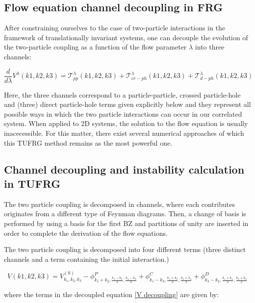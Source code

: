 \documentclass[12pt]{article}
\begin{document}
\subsection{ Flow equation channel decoupling in FRG }

After constraining ourselves to the case of two-particle interactions in the framework of translationally invariant systems, one can decouple  the evolution of the two-particle coupling as a function of the flow parameter $\lambda$ into three channels:

\begin{equation}\label{3 channels}
    \frac{d}{d\lambda} V^{\lambda}(k1, k2, k3) = \mathcal{T}_{pp}^{\lambda}(k1,k2,k3) + \mathcal{T}_{cr-ph}^{\lambda}(k1,k2,k3) +\mathcal{T}_{d-ph}^{\lambda}(k1,k2,k3)
\end{equation}

Here, the three channels correspond to a particle-particle, crossed particle-hole and (three) direct particle-hole terms given explicitly below and they represent all possible ways in which the two particle interactions can occur in our correlated system. When applied to 2D systems, the solution to the flow equation is usually inacecessible. For this matter, there exist several numerical approaches of which this TUFRG method remains as the most powerful one.


\subsection{ Channel decoupling and instability calculation in TUFRG}

The two particle coupling is decomposed in channels, where each contributes originates from a different type of Feynman diagrams. Then, a change of basis is performed by using a basis for the first BZ and partitions of unity are inserted in order to complete the derivation of the flow equations.

The two particle coupling is decomposed into four different terms (three distinct channels and a term containing the initial interaction.)

\begin{equation} \label{V decoupling}
    V(k1,k2,k3)= V_{k_1, k_2, k_3}^{(0)} - \phi^{P}_{k_1 +k_2, \frac{k_1 - k_2}{2}, \frac{k_4-k_3}{2}} + \phi^{C}_{k_1 - k_3, \frac{k_1 +k_3}{2}, \frac{k_2+k_4}{2}} +\phi^{D}_{k_3- k_2, \frac{k_1 + k_4}{2}, \frac{k_2+k_3}{2}}
\end{equation}

where the terms in the decoupled equation \eqref{V decoupling} are given by:
\end{document}
